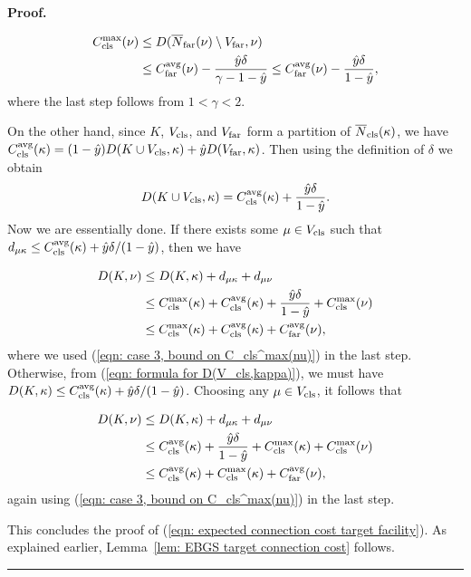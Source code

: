 \documentclass[oneside,final]{ucr}
\newenvironment{proof}[1][Proof]{\textbf{#1.} }{\ \rule{0.5em}{0.5em}}
\def\dsp{\def\baselinestretch{2.0}\large\normalsize}
\def\ssp{\def\baselinestretch{1.0}\large\normalsize}
\begin{document}
\begin{proof}
\begin{description}
\ssp
  \begin{align}
    C_{{\mbox{\scriptsize\rm cls}}}^{\max}(\nu) &\leq D({\overline{N}}_{{\mbox{\scriptsize\rm far}}}(\nu) \setminus V_{{\mbox{\scriptsize\rm far}}}, \nu) 
			\notag
		\\
		&\leq C_{{\mbox{\scriptsize\rm far}}}^{{\mbox{\scriptsize\rm avg}}}(\nu) - \frac{\hat{y}\delta}{\gamma-1-\hat{y}} 
		\leq C_{{\mbox{\scriptsize\rm far}}}^{{\mbox{\scriptsize\rm avg}}}(\nu) - \frac{\hat{y}\delta}{1-\hat{y}},
			\label{eqn: case 3, bound on C_cls^max(nu)}
  \end{align}
\dsp
where the last step follows from $1 < \gamma < 2$. 

On the other hand, since $K$, $V_{{\mbox{\scriptsize\rm cls}}}$, and $V_{{\mbox{\scriptsize\rm far}}}$ form a partition of ${\overline{N}}_{{\mbox{\scriptsize\rm cls}}}(\kappa)$,
we have
$C_{{\mbox{\scriptsize\rm cls}}}^{{\mbox{\scriptsize\rm avg}}}(\kappa) = (1-\hat{y}) D(K\cup V_{{\mbox{\scriptsize\rm cls}}}, \kappa) + \hat{y} D(V_{{\mbox{\scriptsize\rm far}}}, \kappa)$.
Then using the definition of $\delta$ we obtain
%
\begin{equation}
    D(K \cup V_{{\mbox{\scriptsize\rm cls}}}, \kappa) = C_{{\mbox{\scriptsize\rm cls}}}^{{\mbox{\scriptsize\rm avg}}}(\kappa) + \frac{\hat{y}\delta}{1-\hat{y}}.
				\label{eqn: formula for D(V_cls,kappa)}
\end{equation}
%
  Now we are essentially done. If there exists some $\mu \in V_{{\mbox{\scriptsize\rm cls}}}$ such
  that $d_{\mu\kappa} \leq C_{{\mbox{\scriptsize\rm cls}}}^{{\mbox{\scriptsize\rm avg}}}(\kappa) +
  \hat{y}\delta/(1-\hat{y})$, then we have

\ssp
  \begin{align*}
    D(K, \nu) &\leq D(K, \kappa) + d_{\mu\kappa} + d_{\mu\nu} \\
    &\leq C_{{\mbox{\scriptsize\rm cls}}}^{\max}(\kappa) + C_{{\mbox{\scriptsize\rm cls}}}^{{\mbox{\scriptsize\rm avg}}}(\kappa) +
    			\frac{\hat{y}\delta}{1-\hat{y}}
    + C_{{\mbox{\scriptsize\rm cls}}}^{\max}(\nu)\\
    &\leq C_{{\mbox{\scriptsize\rm cls}}}^{\max}(\kappa) + C_{{\mbox{\scriptsize\rm cls}}}^{{\mbox{\scriptsize\rm avg}}}(\kappa) + C_{{\mbox{\scriptsize\rm far}}}^{{\mbox{\scriptsize\rm avg}}}(\nu),
  \end{align*}
\dsp
where we used (\ref{eqn: case 3, bound on C_cls^max(nu)}) in the last step.
  Otherwise, from (\ref{eqn: formula for D(V_cls,kappa)}),
we must have $D(K, \kappa) \leq C_{{\mbox{\scriptsize\rm cls}}}^{{\mbox{\scriptsize\rm avg}}}(\kappa) +
  \hat{y}\delta/(1-\hat{y})$. Choosing any $\mu \in V_{{\mbox{\scriptsize\rm cls}}}$, it follows that

\ssp
  \begin{align*}
    D(K, \nu) &\leq D(K, \kappa) + d_{\mu\kappa} + d_{\mu\nu} \\
    &\leq C_{{\mbox{\scriptsize\rm cls}}}^{{\mbox{\scriptsize\rm avg}}}(\kappa) + \frac{\hat{y}\delta}{1-\hat{y}} +
    		C_{{\mbox{\scriptsize\rm cls}}}^{\max}(\kappa)  + C_{{\mbox{\scriptsize\rm cls}}}^{\max}(\nu)\\
    &\leq C_{{\mbox{\scriptsize\rm cls}}}^{{\mbox{\scriptsize\rm avg}}}(\kappa) + C_{{\mbox{\scriptsize\rm cls}}}^{\max}(\kappa) + C_{{\mbox{\scriptsize\rm far}}}^{{\mbox{\scriptsize\rm avg}}}(\nu),
  \end{align*}
\dsp
again using (\ref{eqn: case 3, bound on C_cls^max(nu)}) in the last step.

\end{description}

This concludes the proof of (\ref{eqn: expected connection
  cost target facility}).  As explained earlier,
Lemma~\ref{lem: EBGS target connection cost} follows.
\end{proof}
\end{document}
